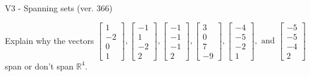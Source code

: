 \begin{exercise}
  \begin{exerciseTitle}V3 - Spanning sets (ver. 366)\end{exerciseTitle}
  \begin{exerciseStatement}
    Explain why the vectors \(\left[\begin{array}{r}
1 \\
-2 \\
0 \\
1
\end{array}\right] , \left[\begin{array}{r}
-1 \\
1 \\
-2 \\
2
\end{array}\right] , \left[\begin{array}{r}
-1 \\
-1 \\
-1 \\
2
\end{array}\right] , \left[\begin{array}{r}
3 \\
0 \\
7 \\
-9
\end{array}\right] , \left[\begin{array}{r}
-4 \\
-5 \\
-2 \\
1
\end{array}\right] , \text{ and } \left[\begin{array}{r}
-5 \\
-5 \\
-4 \\
2
\end{array}\right]\) span or don't span \(\mathbb{R}^4\). 
	



\end{exerciseStatement}
\end{exercise}
